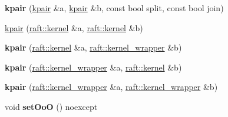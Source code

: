 \begin{DoxyCompactItemize}
\item 
\hypertarget{classkpair_a7cb2f1509ee3c745ab0e69b54cd833cb}{}\label{classkpair_a7cb2f1509ee3c745ab0e69b54cd833cb} 
{\bfseries kpair} (\hyperlink{classkpair}{kpair} \&a, \hyperlink{classkpair}{kpair} \&b, const bool split, const bool join)
\item 
\hyperlink{classkpair_a7ff7f76ea14d66007a4506c23bd235fc}{kpair} (\hyperlink{classraft_1_1kernel}{raft\+::kernel} \&a, \hyperlink{classraft_1_1kernel}{raft\+::kernel} \&b)
\item 
\hypertarget{classkpair_a024b831bbd44cf42f8dba5a4e75f0c84}{}\label{classkpair_a024b831bbd44cf42f8dba5a4e75f0c84} 
{\bfseries kpair} (\hyperlink{classraft_1_1kernel}{raft\+::kernel} \&a, \hyperlink{classraft_1_1kernel__wrapper}{raft\+::kernel\+\_\+wrapper} \&b)
\item 
\hypertarget{classkpair_aa23a1f8b31cb403dcfb21bff41ff576f}{}\label{classkpair_aa23a1f8b31cb403dcfb21bff41ff576f} 
{\bfseries kpair} (\hyperlink{classraft_1_1kernel__wrapper}{raft\+::kernel\+\_\+wrapper} \&a, \hyperlink{classraft_1_1kernel}{raft\+::kernel} \&b)
\item 
\hypertarget{classkpair_a21984a6e187ee9ba81fd41b931304890}{}\label{classkpair_a21984a6e187ee9ba81fd41b931304890} 
{\bfseries kpair} (\hyperlink{classraft_1_1kernel__wrapper}{raft\+::kernel\+\_\+wrapper} \&a, \hyperlink{classraft_1_1kernel__wrapper}{raft\+::kernel\+\_\+wrapper} \&b)
\item 
\hypertarget{classkpair_ace4e7bde763a54ef96cf167525fdd3f4}{}\label{classkpair_ace4e7bde763a54ef96cf167525fdd3f4} 
void {\bfseries set\+OoO} () noexcept
\end{DoxyCompactItemize}
